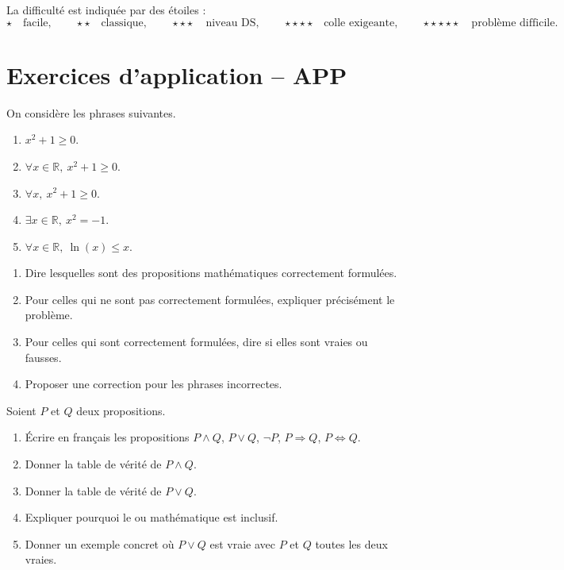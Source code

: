 \documentclass[11pt,a4paper]{article}
\newcommand{\R}{\mathbb{R}}
\newcommand{\non}{\neg}
\newcommand{\et}{\wedge}
\newcommand{\ou}{\vee}
\newcommand{\imp}{\Rightarrow}
\newcommand{\ssi}{\Longleftrightarrow}
\begin{document}
La difficulté est indiquée par des étoiles :
\[
\star \quad \text{facile},\qquad
\star\star \quad \text{classique},\qquad
\star\star\star \quad \text{niveau DS},\qquad
\star\star\star\star \quad \text{colle exigeante},\qquad
\star\star\star\star\star \quad \text{problème difficile}.
\]

\newpage

\section{Exercices d'application -- APP}

\begin{exercicebox}
On considère les phrases suivantes.

\begin{enumerate}
    \item \(x^2+1\geq 0\).
    \item \(\forall x\in\R,\ x^2+1\geq 0\).
    \item \(\forall x,\ x^2+1\geq0\).
    \item \(\exists x\in\R,\ x^2=-1\).
    \item \(\forall x\in\R,\ \ln(x)\leq x\).
\end{enumerate}

\begin{enumerate}[label=\alph*)]
    \item Dire lesquelles sont des propositions mathématiques correctement formulées.
    \item Pour celles qui ne sont pas correctement formulées, expliquer précisément le problème.
    \item Pour celles qui sont correctement formulées, dire si elles sont vraies ou fausses.
    \item Proposer une correction pour les phrases incorrectes.
\end{enumerate}
\end{exercicebox}

\begin{exercicebox}
Soient \(P\) et \(Q\) deux propositions.

\begin{enumerate}[label=\alph*)]
    \item Écrire en français les propositions \(P\et Q\), \(P\ou Q\), \(\non P\), \(P\imp Q\), \(P\ssi Q\).
    \item Donner la table de vérité de \(P\et Q\).
    \item Donner la table de vérité de \(P\ou Q\).
    \item Expliquer pourquoi le \og ou \fg{} mathématique est inclusif.
    \item Donner un exemple concret où \(P\ou Q\) est vraie avec \(P\) et \(Q\) toutes les deux vraies.
\end{enumerate}
\end{exercicebox}
\end{document}
